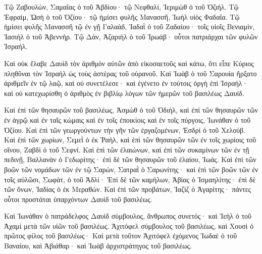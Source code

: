 {Τῷ Ζαβουλὼν, Σαμαΐας ὁ τοῦ Ἀβδίου· τῷ Νεφθαλὶ, Ἰεριμὼθ ὁ τοῦ Ὀζιήλ.
Τῷ Ἐφραὶμ, Ὠσὴ ὁ τοῦ Ὀζίου· τῷ ἡμίσει φυλῆς Μανασσῆ, Ἰωὴλ υἱὸς Φαδαΐα.
Τῷ ἡμίσει φυλῆς Μανασσῆ τῷ ἐν γῇ Γαλαὰδ, Ἰαδαῒ ὁ τοῦ Ζαδαίου· τοῖς υἱοῖς Βενιαμὶν, Ἰασιὴλ ὁ τοῦ Ἀβεννήρ.
Τῷ Δὰν, Ἀζαριὴλ ὁ τοῦ Ἰρωάβ· οὗτοι πατριάρχαι τῶν φυλῶν Ἰσραήλ.
\par }{\PP {}Καὶ οὐκ ἔλαβε Δαυὶδ τὸν ἀριθμὸν αὐτῶν ἀπὸ εἰκοσαετοῦς καὶ κάτω, ὅτι εἶπε Κύριος πληθῦναι τὸν Ἰσραὴλ ὡς τοὺς ἀστέρας τοῦ οὐρανοῦ.
Καὶ Ἰωὰβ ὁ τοῦ Σαρουία ἤρξατο ἀριθμεῖν ἐν τῷ λαῷ, καὶ οὐ συνετέλεσε· καὶ ἐγένετο ἐν τούτοις ὀργὴ ἐπὶ Ἰσραήλ· καὶ οὐ κατεχωρίσθη ὁ ἀριθμὸς ἐν βιβλίῳ λόγων τῶν ἡμερῶν τοῦ βασιλέως Δαυίδ.
\par }{\PP {}Καὶ ἐπὶ τῶν θησαυρῶν τοῦ βασιλέως, Ἀσμὼθ ὁ τοῦ Ὀδιὴλ, καὶ ἐπὶ τῶν θησαυρῶν τῶν ἐν ἀγρῷ καὶ ἐν ταῖς κώμαις καὶ ἐν τοῖς ἐποικίοις καὶ ἐν τοῖς πύργοις, Ἰωνάθαν ὁ τοῦ Ὀζίου.
Καὶ ἐπὶ τῶν γεωργούντων τὴν γῆν τῶν ἐργαζομένων, Ἐσδρὶ ὁ τοῦ Χελούβ.
Καὶ ἐπὶ τῶν χωρίων, Σεμεῒ ὁ ἐκ Ῥαὴλ, καὶ ἐπὶ τῶν θησαυρῶν τῶν ἐν τοῖς χωρίοις τοῦ οἴνου, Ζαβδὶ ὁ τοῦ Σεφνί.
Καὶ ἐπὶ τῶν ἐλαιώνων, καὶ ἐπὶ τῶν συκαμίνων τῶν ἐν τῇ πεδινῇ, Βαλλανὰν ὁ Γεδωρίτης· ἐπὶ δὲ τῶν θησαυρῶν τοῦ ἐλαίου, Ἰωάς.
Καὶ ἐπὶ τῶν βοῶν τῶν νομάδων τῶν ἐν τῷ Σαρὼν, Σατραῒ ὁ Σαρωνίτης· καὶ ἐπὶ τῶν βοῶν τῶν ἐν τοῖς αὐλῶσι, Σωφὰτ, ὁ τοῦ Ἀδλί·
Ἐπὶ δὲ τῶν καμήλων, Ἀβίας ὁ Ἰσμαηλίτης· ἐπὶ δὲ τῶν ὄνων, Ἰαδίας ὁ ἐκ Μεραθών.
Καὶ ἐπὶ τῶν προβάτων, Ἰαζὶζ ὁ Ἀγαρίτης· πάντες οὗτοι προστάται ὑπαρχόντων Δαυὶδ τοῦ βασιλέως.
\par }{\PP {}Καὶ Ἰωνάθαν ὁ πατράδελφος Δαυὶδ σύμβουλος, ἄνθρωπος συνετός· καὶ Ἰεὴλ ὁ τοῦ Ἀχαμὶ μετὰ τῶν υἱῶν τοῦ βασιλέως.
Ἀχιτόφελ σύμβουλος τοῦ βασιλέως, καὶ Χουσὶ ὁ πρῶτος φίλος τοῦ βασιλέως·
Καὶ μετὰ τοῦτον Ἀχιτόφελ ἐχόμενος Ἰωδαὲ ὁ τοῦ Βαναίου, καὶ Ἀβιάθαρ· καὶ Ἰωὰβ ἀρχιστράτηγος τοῦ βασιλέως.

}
